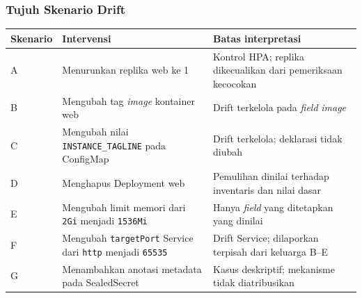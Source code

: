 {
\usebackgroundtemplate{\backgroundcontent}
\begin{frame}
    \frametitle{Tujuh Skenario Drift}
    \centering
    \scriptsize
    \begin{tabular}{@{}>{\raggedright\arraybackslash}p{1.25cm}>{\raggedright\arraybackslash}p{5.0cm}>{\raggedright\arraybackslash}p{5.25cm}@{}}
        \toprule
        \textbf{Skenario} & \textbf{Intervensi} & \textbf{Batas interpretasi} \\
        \midrule
        A & Menurunkan replika web ke 1 & Kontrol HPA; replika dikecualikan dari pemeriksaan kecocokan \\
        B & Mengubah tag \textit{image} kontainer web & Drift terkelola pada \textit{field} \textit{image} \\
        C & Mengubah nilai \texttt{INSTANCE\_TAGLINE} pada ConfigMap & Drift terkelola; deklarasi tidak diubah \\
        D & Menghapus Deployment web & Pemulihan dinilai terhadap inventaris dan nilai dasar \\
        E & Mengubah limit memori dari \texttt{2Gi} menjadi \texttt{1536Mi} & Hanya \textit{field} yang ditetapkan yang dinilai \\
        F & Mengubah \texttt{targetPort} Service dari \texttt{http} menjadi \texttt{65535} & Drift Service; dilaporkan terpisah dari keluarga B--E \\
        G & Menambahkan anotasi metadata pada SealedSecret & Kasus deskriptif; mekanisme tidak diatribusikan \\
        \bottomrule
    \end{tabular}
    \vspace{0.10cm}
\end{frame}
}

